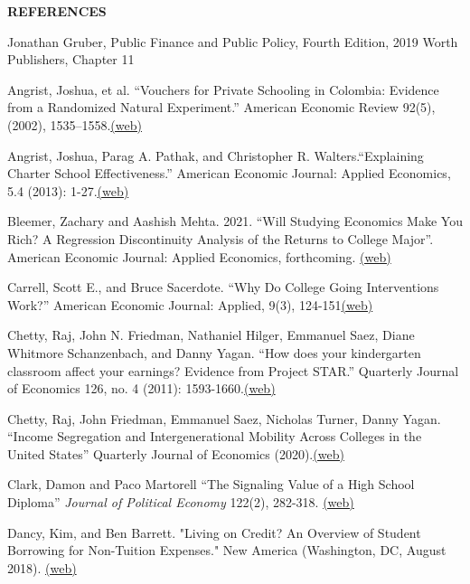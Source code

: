 \documentclass[landscape]{slides}
\begin{document}
\begin{slide}
\begin{center}
{\bf REFERENCES}
\end{center}
{\small

Jonathan Gruber, Public Finance and Public Policy, Fourth Edition, 2019 Worth Publishers, Chapter 11

Angrist, Joshua, et al. ``Vouchers for Private Schooling in Colombia: Evidence from a Randomized Natural Experiment.'' American Economic Review 92(5), (2002), 1535--1558.\href{http://elsa.berkeley.edu/~saez/course131/angristetalAER02.pdf}{(web)}

Angrist, Joshua, Parag A. Pathak, and Christopher R. Walters.``Explaining Charter School Effectiveness.'' American Economic Journal: Applied Economics, 5.4 (2013): 1-27.\href{http://elsa.berkeley.edu/~saez/course131/Angrist-Pathak-Walters13.pdf}{(web)}

Bleemer, Zachary  and Aashish Mehta. 2021. ``Will Studying Economics Make You Rich? A Regression Discontinuity Analysis of the Returns to College Major''. American Economic Journal: Applied Economics, forthcoming.
\href{http://elsa.berkeley.edu/~saez/course131/bleemerAEJ21.pdf}{(web)}

Carrell, Scott E., and Bruce Sacerdote. ``Why Do College Going Interventions Work?'' American Economic Journal: Applied, 9(3), 124-151\href{http://elsa.berkeley.edu/~saez/course131/carrell-sacerdoteAEJ17.pdf}{(web)}

Chetty, Raj, John N. Friedman, Nathaniel Hilger, Emmanuel Saez, Diane Whitmore Schanzenbach, and Danny Yagan. ``How does your kindergarten classroom affect your earnings? Evidence from Project STAR.'' Quarterly Journal of Economics 126, no. 4 (2011): 1593-1660.\href{http://elsa.berkeley.edu/~saez/chettyetalQcarrE11star.pdf}{(web)}

Chetty, Raj, John Friedman, Emmanuel Saez, Nicholas Turner, Danny Yagan. ``Income Segregation and Intergenerational Mobility Across Colleges in the United States'' Quarterly Journal of Economics (2020).\href{https://eml.berkeley.edu/~saez/chettyetalQJE20college.pdf}{(web)}

Clark, Damon  and Paco Martorell ``The Signaling Value of a High School Diploma'' 
\emph{Journal of Political Economy} 122(2), 282-318.
\href{http://www.jstor.org/stable/pdf/10.1086/675238.pdf}{(web)}

Dancy, Kim, and Ben Barrett. "Living on Credit? An Overview of Student Borrowing for Non-Tuition Expenses." New America (Washington, DC, August 2018). \href{http://elsa.berkeley.edu/~saez/course131/LivingonCredit18.pdf}{(web)}

}
\end{slide}
\end{document}
